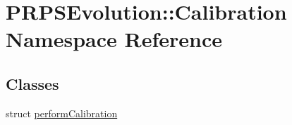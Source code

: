\hypertarget{namespace_p_r_p_s_evolution_1_1_calibration}{\section{\-P\-R\-P\-S\-Evolution\-:\-:\-Calibration \-Namespace \-Reference}
\label{namespace_p_r_p_s_evolution_1_1_calibration}
}
\subsection*{\-Classes}
\begin{DoxyCompactItemize}
\item 
struct \hyperlink{struct_p_r_p_s_evolution_1_1_calibration_1_1perform_calibration}{perform\-Calibration}
\end{DoxyCompactItemize}
